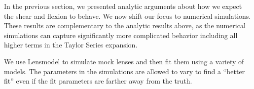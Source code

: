 In the previous section, we presented analytic arguments about how we expect the shear and flexion to behave. We now shift our focus to numerical simulations. These results are complementary to the analytic results above, as the numerical simulations can capture significantly more complicated behavior including all higher terms in the Taylor Series expansion. 

We use Lensmodel \citep{Keeton01} to simulate mock lenses and then fit them using a variety of models. The parameters in the simulations are allowed to vary to find a ``better fit'' even if the fit parameters are farther away from the truth. 